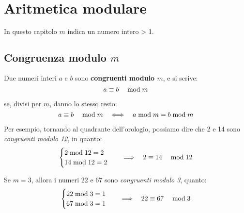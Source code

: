 \chapter{Aritmetica modulare}
\label{ch:aritmetica_modulare}

In questo capitolo $m$ indica un numero intero > 1.

\section{Congruenza modulo $m$}
\label{sec:congruenza_modulo_m}

\begin{definizione}
    Due numeri interi $a$ e $b$ sono \textbf{congruenti modulo $m$}, e si scrive:
    \begin{equation*}
         a \equiv b \quad\bmod m 
    \end{equation*}

    se, divisi per $m$, danno lo stesso resto:
    \begin{equation}
        \label{eq:def_congruenza}  a \equiv b \quad\bmod m   \quad\Longleftrightarrow\quad  a  \bmod  m = b  \bmod  m
    \end{equation}

\end{definizione}

Per esempio, tornando al quadrante dell'orologio, possiamo dire che 2 e 14 sono \emph{congruenti modulo 12}, in quanto:
\begin{equation*}
    \begin{cases}
        2  \bmod  12 = 2 \\
        14  \bmod  12 = 2
    \end{cases}
    \quad\Longrightarrow\quad
     2 \equiv 14 \quad\bmod 12 
\end{equation*}

Se $m = 3$, allora i numeri 22 e 67 sono \emph{congruenti modulo 3}, quanto:
\begin{equation*}
    \begin{cases}
        22  \bmod  3 = 1 \\
        67  \bmod  3 = 1
    \end{cases}
    \quad\Longrightarrow\quad
     22 \equiv 67 \quad\bmod 3 
\end{equation*}

